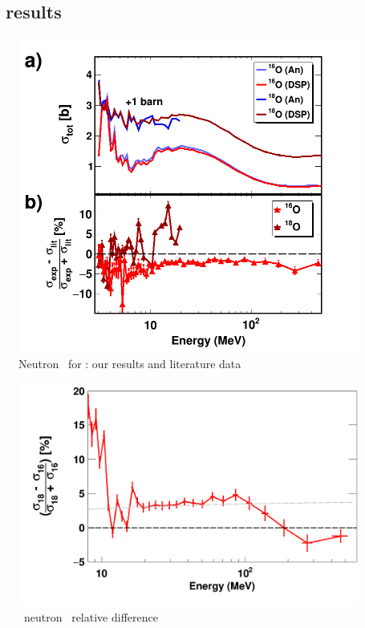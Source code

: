 \subsection{\oSixEight\ \tot\ results}
\begin{figure}
    \includegraphics[scale=0.35]{figures/TwoPanelO.png}
    \caption{Neutron \tot\ for \oSixEight: our results and literature data}
    \label{TwoPanelO}
\end{figure}

        \cite{Finlay1993, Perey1972, Vaughn1965, Salisbury1965}

\begin{figure}
    \includegraphics[scale=0.35]{figures/relativeDiff_O18O16.png}
    \caption{\oSixEight\ neutron \tot\ relative difference}
    \label{IsotopicDifferenceO}
\end{figure}

